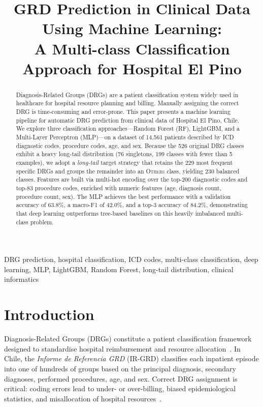 \documentclass{IEEEtran}
\title{GRD Prediction in Clinical Data Using Machine Learning:\\
A Multi-class Classification Approach for Hospital El Pino}
\author{
  \IEEEauthorblockN{Cristóbal Flores Villegas,
                    Benjamin Peña Díaz,
                    Matías Muñoz Parraguirre,
                    Francisco Morales Díaz.
                   }
                   
  \IEEEauthorblockA{
    \textit{Escuela de Informática, Ingeniería Civil Informática}\\
    \textit{Universidad Andrés Bello}\\
    Santiago, Chile \\
    \texttt{CINF104 – Aprendizaje de Máquinas, 2026}
  }
}
\begin{document}
\maketitle

\begin{abstract}
Diagnosis-Related Groups (DRGs) are a patient classification system
widely used in healthcare for hospital resource planning and billing.
Manually assigning the correct DRG is time-consuming and error-prone.
This paper presents a machine learning pipeline for automatic DRG
prediction from clinical data of Hospital El Pino, Chile.
We explore three classification approaches—Random Forest (RF),
LightGBM, and a Multi-Layer Perceptron (MLP)—on a dataset of
14{,}561 patients described by ICD diagnostic codes, procedure codes,
age, and sex.
Because the 526 original DRG classes exhibit a heavy long-tail
distribution (76 singletons, 199 classes with fewer than 5 examples),
we adopt a \emph{long-tail} target strategy that retains the 229 most
frequent specific DRGs and groups the remainder into an \textsc{Others}
class, yielding 230 balanced classes.
Features are built via multi-hot encoding over the top-200 diagnostic
codes and top-83 procedure codes, enriched with numeric features
(age, diagnosis count, procedure count, sex).
The MLP achieves the best performance with a validation accuracy of
63.8\%, a macro-F1 of 42.0\%, and a top-3 accuracy of 84.2\%,
demonstrating that deep learning outperforms tree-based baselines
on this heavily imbalanced multi-class problem.
\end{abstract}

\begin{IEEEkeywords}
DRG prediction, hospital classification, ICD codes, multi-class
classification, deep learning, MLP, LightGBM, Random Forest,
long-tail distribution, clinical informatics
\end{IEEEkeywords}

\section{Introduction}

Diagnosis-Related Groups (DRGs) constitute a patient classification
framework designed to standardise hospital reimbursement and resource
allocation~\cite{fetter1980drg}.
In Chile, the \emph{Informe de Referencia GRD} (IR-GRD) classifies each
inpatient episode into one of hundreds of groups based on the principal
diagnosis, secondary diagnoses, performed procedures, age, and sex.
Correct DRG assignment is critical: coding errors lead to under- or
over-billing, biased epidemiological statistics, and misallocation
of hospital resources~\cite{topol2019highperformance}.
\end{document}
